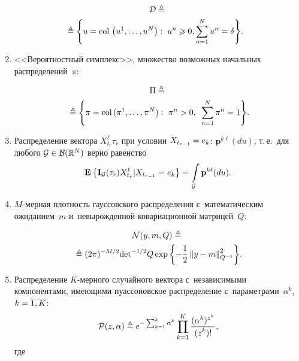 \begin{multicols}{2}
\begin{enumerate}[1.]
 \vspace*{-5pt}
 
 \noindent
 \begin{multline*}
 \mathcal{D} \ebd{}\\
 \hspace*{-9.43114pt}{}\ebd \left\{u=\col\,\left(u^1,\ldots,u^N\right):\; u^n \geqslant 0, %
\sum\limits_{n=1}^Nu^n= \delta \right\}\!.
\end{multline*}

\item  <<Вероятностный симплекс>>, множество воз\-мож\-ных начальных распределений~$\pi$:

 \vspace*{-5pt}
 
 \noindent
 \begin{multline*}
 \Pi \triangleq{}\\
\hspace*{-6.22176pt} {}\triangleq \left\{\pi=\mathop{\mathrm{col}}\,(\pi^1,\ldots,\pi^N):\ \pi^n > 0,\enskip \sum\limits_{n=1}^N\pi^n = 1 
\right\}\!.\hspace*{-6.55559pt}
\end{multline*} 

 \item
 Распределение вектора $ X_{t_{r}}^{\ell}\tau_{r}$ 
при условии $X_{t_{r-1}}\hm=e_k$:
$\mathbf{p}^{k \ell}(du)$, т.\,е.\
 для любого $\mathcal{G} \hm\in \mathcal{B}(\mathbb{R}^N)$ вер\-но равенство
 $$
  \mathbf{E}_{  }\left\{ \mathop{\mathbf{I}_{\mathcal{G}}(\tau_r)X_{t_r}^{\ell}|X_{t_{r-1}}=e_k} \right\} =  \int\limits_{\mathcal{G}} \mathbf{p}^{k \ell}(du).
  $$
 \item
 $M$-мер\-ная плот\-ность гауссовского распределения с~математическим 
ожиданием~$m$ и~не\-вы\-рож\-ден\-ной ковариационной мат\-ри\-цей~$Q$:

 \vspace*{-5pt}
 
 \noindent
\begin{multline*}
\mathcal{N}(y,m,Q) \triangleq{}\\
{}\triangleq (2\pi)^{-{M}/{2}} \mathrm{det}^{-{1}/{2}} Q 
\exp\left\{ - \displaystyle\frac{\displaystyle 1\mathstrut}{\displaystyle 2\mathstrut}\left\|y- 
m\right\|^2_{Q^{-1}}
\right\}\!.
\end{multline*}
 \item
  Распределение $K$-мер\-но\-го 
случайного вектора с~независимыми компонентами, 
име\-ющи\-ми пуассоновское распределение с~па\-ра\-мет\-ра\-ми~$\alpha^k$, 
$k\hm=\overline{1,K}$:
$$
\mathcal{P}(z,\alpha) \triangleq e^{-\sum\nolimits_{k=1}^k \alpha^k}
 \prod\limits_{k=1}^K \displaystyle\frac{\displaystyle (\alpha^k)^{z^k}\mathstrut}{\displaystyle (z^k)!\mathstrut},
 $$
 где
 

\end{enumerate}
\end{multicols}
